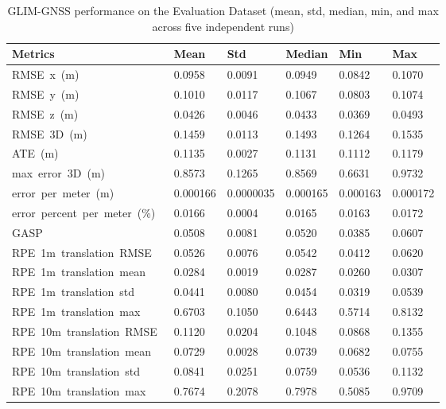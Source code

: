 \begin{table}[htbp]
\centering
\caption{GLIM-GNSS performance on the Evaluation Dataset (mean, std, median, min, and max across five independent runs)}
\label{tab:eval_proposed_performance}
\begin{tabularx}{\textwidth}{lXXXXX}
\toprule
\textbf{Metrics} & \textbf{Mean} & \textbf{Std} & \textbf{Median} & \textbf{Min} & \textbf{Max} \\ \midrule
RMSE\ x\ (m)\        & 0.0958   & 0.0091   & 0.0949   & 0.0842   & 0.1070   \\
RMSE\ y\ (m)\        & 0.1010   & 0.0117   & 0.1067   & 0.0803   & 0.1074   \\
RMSE\ z\ (m)\        & 0.0426   & 0.0046   & 0.0433   & 0.0369   & 0.0493   \\
RMSE\ 3D\ (m)\       & 0.1459   & 0.0113   & 0.1493   & 0.1264   & 0.1535   \\
ATE\ (m)\            & 0.1135   & 0.0027   & 0.1131   & 0.1112   & 0.1179   \\
max\ error\ 3D\ (m)\ & 0.8573   & 0.1265   & 0.8569   & 0.6631   & 0.9732   \\
error\ per\ meter\ (m)\        & 0.000166 & 0.0000035& 0.000165 & 0.000163 & 0.000172 \\
error\ percent\ per\ meter\ (\%)\ & 0.0166   & 0.0004   & 0.0165   & 0.0163   & 0.0172   \\
GASP\                & 0.0508   & 0.0081   & 0.0520   & 0.0385   & 0.0607   \\
RPE\ 1m\ translation\ RMSE\  & 0.0526 & 0.0076 & 0.0542 & 0.0412 & 0.0620 \\
RPE\ 1m\ translation\ mean\  & 0.0284 & 0.0019 & 0.0287 & 0.0260 & 0.0307 \\
RPE\ 1m\ translation\ std\   & 0.0441 & 0.0080 & 0.0454 & 0.0319 & 0.0539 \\
RPE\ 1m\ translation\ max\   & 0.6703 & 0.1050 & 0.6443 & 0.5714 & 0.8132 \\
RPE\ 10m\ translation\ RMSE\ & 0.1120 & 0.0204 & 0.1048 & 0.0868 & 0.1355 \\
RPE\ 10m\ translation\ mean\ & 0.0729 & 0.0028 & 0.0739 & 0.0682 & 0.0755 \\
RPE\ 10m\ translation\ std\  & 0.0841 & 0.0251 & 0.0759 & 0.0536 & 0.1132 \\
RPE\ 10m\ translation\ max\  & 0.7674 & 0.2078 & 0.7978 & 0.5085 & 0.9709 \\ \bottomrule
\end{tabularx}
\end{table}

